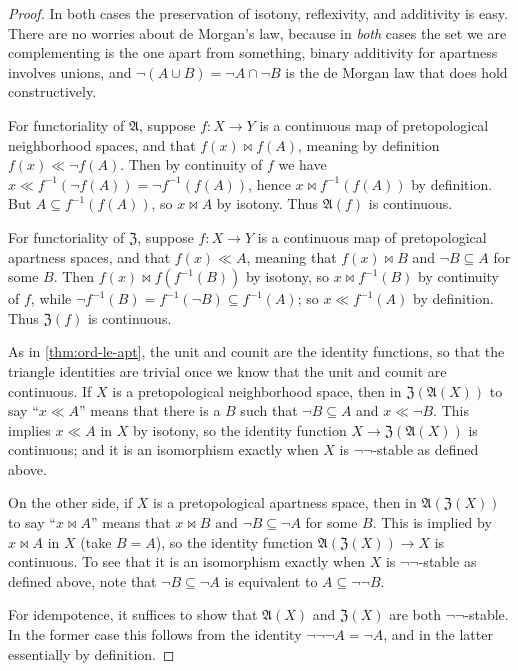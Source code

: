 \documentclass{article}
\def\cpl#1{\neg #1}
\def\inv{^{-1}}
\def\anti{\mathfrak{A}}
\def\neigh{\mathfrak{Z}}
\def\nn{\ensuremath{\neg\neg}}
\begin{document}
\begin{proof}
  In both cases the preservation of isotony, reflexivity, and additivity is easy.
  There are no worries about de Morgan's law, because in \emph{both} cases the set we are complementing is the one apart from something, binary additivity for apartness involves unions, and $\cpl{(A\cup B)} = \cpl{A} \cap \cpl{B}$ is the de Morgan law that does hold constructively.

  For functoriality of $\anti$, suppose $f:X\to Y$ is a continuous map of pretopological neighborhood spaces, and that $f(x) \bowtie f(A)$, meaning by definition $f(x)\ll \cpl{f(A)}$.
  Then by continuity of $f$ we have $x \ll f\inv(\cpl{f(A)}) = \cpl{f\inv(f(A))}$, hence $x\bowtie f\inv(f(A))$ by definition.
  But $A \subseteq f\inv(f(A))$, so $x\bowtie A$ by isotony.
  Thus $\anti(f)$ is continuous.

  For functoriality of $\neigh$, suppose $f:X\to Y$ is a continuous map of pretopological apartness spaces, and that $f(x) \ll A$, meaning that $f(x) \bowtie B$ and $\cpl{B} \subseteq A$ for some $B$.
  Then $f(x) \bowtie f(f\inv(B))$ by isotony, so $x\bowtie f\inv(B)$ by continuity of $f$, while $\cpl{f\inv(B)} = f\inv(\cpl{B}) \subseteq f\inv(A)$; so $x\ll f\inv(A)$ by definition.
  Thus $\neigh(f)$ is continuous.

  As in \cref{thm:ord-le-apt}, the unit and counit are the identity functions, so that the triangle identities are trivial once we know that the unit and counit are continuous.
  If $X$ is a pretopological neighborhood space, then in $\neigh(\anti(X))$ to say ``$x\ll A$'' means that there is a $B$ such that $\cpl{B}\subseteq A$ and $x\ll \cpl{B}$.
  This implies $x\ll A$ in $X$ by isotony, so the identity function $X\to \neigh(\anti(X))$ is continuous; and it is an isomorphism exactly when $X$ is \nn-stable as defined above.
  
  On the other side, if $X$ is a pretopological apartness space, then in $\anti(\neigh(X))$ to say ``$x\bowtie A$'' means that $x\bowtie B$ and $\cpl{B}\subseteq \cpl{A}$ for some $B$.
  This is implied by $x\bowtie A$ in $X$ (take $B=A$), so the identity function $\anti(\neigh(X)) \to X$ is continuous.
  To see that it is an isomorphism exactly when $X$ is \nn-stable as defined above, note that $\cpl{B}\subseteq \cpl{A}$ is equivalent to $A \subseteq \cpl{\cpl{B}}$.

  For idempotence, it suffices to show that $\anti(X)$ and $\neigh(X)$ are both \nn-stable.
  In the former case this follows from the identity $\cpl{\cpl{\cpl{A}}} = \cpl{A}$, and in the latter essentially by definition.


\end{proof}
\end{document}
